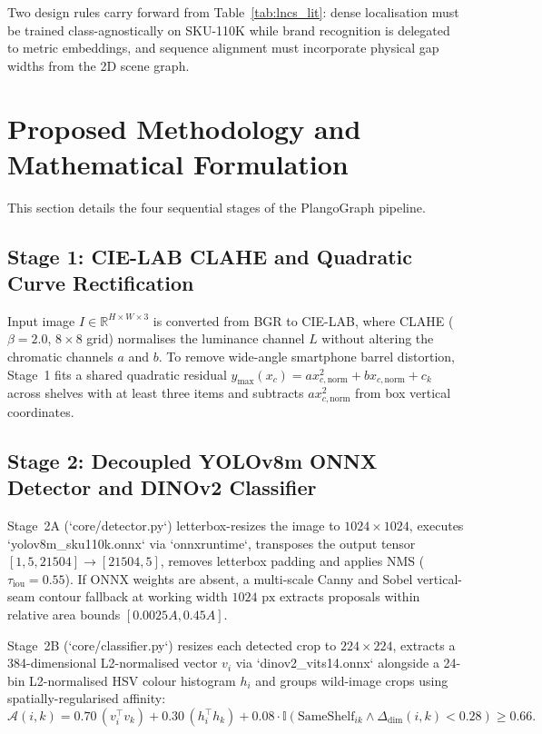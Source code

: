 \documentclass[10pt,a4paper]{article}
\begin{document}
Two design rules carry forward from Table~\ref{tab:lncs_lit}: dense localisation must be trained class-agnostically on SKU-110K while brand recognition is delegated to metric embeddings, and sequence alignment must incorporate physical gap widths from the 2D scene graph.

\section{Proposed Methodology and Mathematical Formulation}
This section details the four sequential stages of the PlangoGraph pipeline.

\subsection{Stage 1: CIE-LAB CLAHE and Quadratic Curve Rectification}
Input image $I \in \mathbb{R}^{H\times W\times 3}$ is converted from BGR to CIE-LAB, where CLAHE ($\beta=2.0$, $8\times 8$ grid) normalises the luminance channel $L$ without altering the chromatic channels $a$ and $b$. To remove wide-angle smartphone barrel distortion, Stage~1 fits a shared quadratic residual $y_{\max}(x_c) = a x_{c,\text{norm}}^2 + b x_{c,\text{norm}} + c_k$ across shelves with at least three items and subtracts $a x_{c,\text{norm}}^2$ from box vertical coordinates.

\subsection{Stage 2: Decoupled YOLOv8m ONNX Detector and DINOv2 Classifier}
Stage~2A (`core/detector.py`) letterbox-resizes the image to $1024\times 1024$, executes `yolov8m_sku110k.onnx` via `onnxruntime`, transposes the output tensor $[1, 5, 21504] \to [21504, 5]$, removes letterbox padding and applies NMS ($\tau_{\text{iou}} = 0.55$). If ONNX weights are absent, a multi-scale Canny and Sobel vertical-seam contour fallback at working width $1024\text{ px}$ extracts proposals within relative area bounds $[0.0025 A, 0.45 A]$.

Stage~2B (`core/classifier.py`) resizes each detected crop to $224\times 224$, extracts a 384-dimensional L2-normalised vector $v_i$ via `dinov2_vits14.onnx` alongside a 24-bin L2-normalised HSV colour histogram $h_i$ and groups wild-image crops using spatially-regularised affinity:
\begin{equation}
    \mathcal{A}(i, k) = 0.70\,(v_i^\top v_k) + 0.30\,(h_i^\top h_k) + 0.08 \cdot \mathbb{I}(\text{SameShelf}_{ik} \wedge \Delta_{\text{dim}}(i,k) < 0.28) \ge 0.66.
\end{equation}
\end{document}
